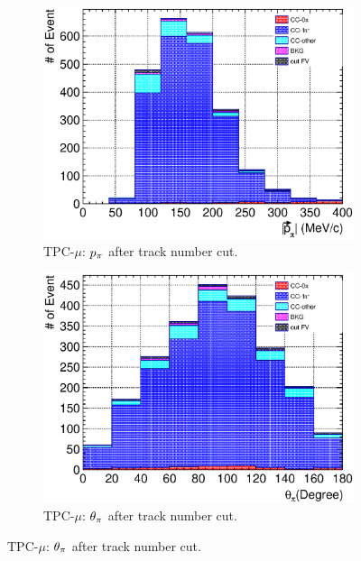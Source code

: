 \begin{figure}
\begin{subfigure}{\dbfigwid\textwidth}
               \end{subfigure}
               \\
               \begin{subfigure}{\dbfigwid\textwidth}
                    \includegraphics[width=\textwidth]{figures/sel/TPCmu_p_pi_stack_al9.eps}
                    \caption{TPC-$\mu$: $p_{\pi}$ after track number cut.}
                    \label{subfig:tlpi-ppi-af-trknumcut-tpc}
               \end{subfigure}
               \begin{subfigure}{\dbfigwid\textwidth}
                    \includegraphics[width=\textwidth]{figures/sel/TPCmu_theta_pi_stack_al9.eps}
                    \caption{TPC-$\mu$: $\theta_{\pi}$ after track number cut.}

\end{subfigure}
\end{figure}
